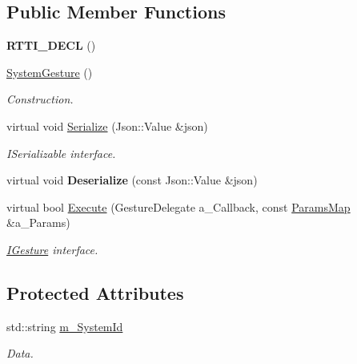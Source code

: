 \subsection*{Public Member Functions}
\begin{DoxyCompactItemize}
\item 
\mbox{\label{class_system_gesture_a23c434744fb9da7882e2bc92bf115a78}} 
{\bfseries R\+T\+T\+I\+\_\+\+D\+E\+CL} ()
\item 
\mbox{\label{class_system_gesture_a7335c2cb71c51592454b89923229aa80}} 
\hyperlink{class_system_gesture_a7335c2cb71c51592454b89923229aa80}{System\+Gesture} ()
\begin{DoxyCompactList}\small\item\em Construction. \end{DoxyCompactList}\item 
\mbox{\label{class_system_gesture_ae65d14438d804bdb37928993aaac441a}} 
virtual void \hyperlink{class_system_gesture_ae65d14438d804bdb37928993aaac441a}{Serialize} (Json\+::\+Value \&json)
\begin{DoxyCompactList}\small\item\em I\+Serializable interface. \end{DoxyCompactList}\item 
\mbox{\label{class_system_gesture_a004764ee2f860645773f2957e5d0f3db}} 
virtual void {\bfseries Deserialize} (const Json\+::\+Value \&json)
\item 
\mbox{\label{class_system_gesture_ae7b4fc979652c0bcf1094b10864a9002}} 
virtual bool \hyperlink{class_system_gesture_ae7b4fc979652c0bcf1094b10864a9002}{Execute} (Gesture\+Delegate a\+\_\+\+Callback, const \hyperlink{class_params_map}{Params\+Map} \&a\+\_\+\+Params)
\begin{DoxyCompactList}\small\item\em \hyperlink{class_i_gesture}{I\+Gesture} interface. \end{DoxyCompactList}\end{DoxyCompactItemize}
\subsection*{Protected Attributes}
\begin{DoxyCompactItemize}
\item 
\mbox{\label{class_system_gesture_aef12d19ba3cf6ed58c54a44260e08509}} 
std\+::string \hyperlink{class_system_gesture_aef12d19ba3cf6ed58c54a44260e08509}{m\+\_\+\+System\+Id}
\begin{DoxyCompactList}\small\item\em Data. \end{DoxyCompactList}\end{DoxyCompactItemize}
